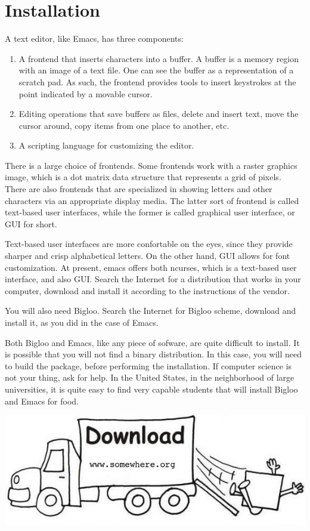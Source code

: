 \documentclass[a4paper,12pt]{book}
\begin{document}
\chapter{Installation}  
A text editor, like Emacs, has three components:
\begin{enumerate}
\item A frontend that inserts characters into a buffer.
A buffer is a memory region with an image of a
text file. One can see the buffer as a representation
of a scratch pad. As such, the frontend provides tools to
insert keystrokes at the  point indicated by 
a movable cursor.
\item Editing operations that save buffers
as files, delete and insert text, move the
cursor around, copy items from one place to another, etc.
\item A scripting language for customizing the editor.
\end{enumerate}

There is a large choice of frontends. Some frontends 
work with a raster graphics image, which  is a dot matrix 
data structure that represents a grid of pixels. 
There are also frontends that are specialized in
showing letters and other characters via an appropriate
display media. The latter sort of frontend is called
text-based user interfaces, while the former is called
graphical user interface, or GUI for short.

Text-based user interfaces are more
confortable on the eyes, since they  provide
sharper and crisp alphabetical letters.
On the other hand, GUI allows for font 
customization. At present,
emacs offers both ncurses, which
is a text-based user interface, and also GUI.
Search the Internet for a distribution that
works in your computer, download and install it
according to the instructions of the vendor.

You will also need Bigloo. Search the Internet
for Bigloo scheme, download and install it, as
you did in the case of Emacs.

Both Bigloo and Emacs, like any piece of sofware,
are quite difficult  to install. It is possible
that you will not find a binary distribution.
In this case, you will need to build the package,
before performing the installation. If computer
science is not your thing, ask for help. In the
United States, in the neighborhood of large
universities, it is quite easy to find very capable
students that will install Bigloo and Emacs for food.

\includegraphics[scale=0.6]{figs-prefix/download.png}
\end{document}
